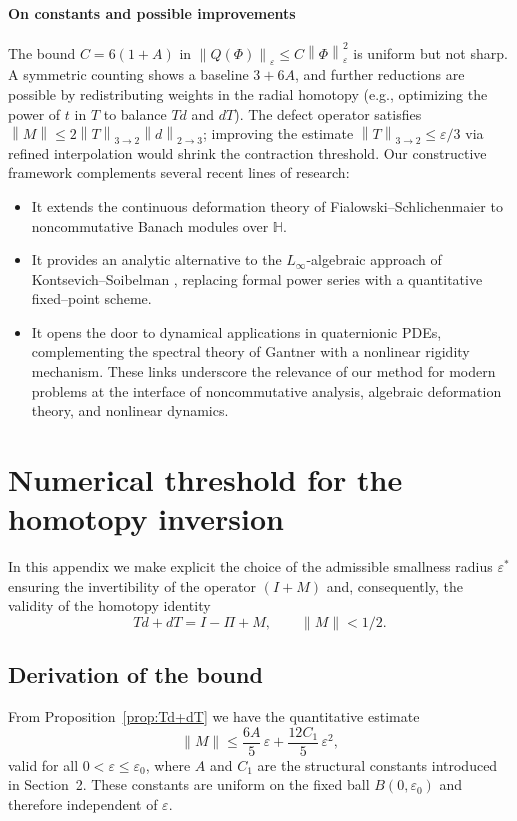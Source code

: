 \documentclass[10pt]{amsart}
\newcommand{\norm}[1]{\left\lVert #1 \right\rVert}
\numberwithin{equation}{section}
\theoremstyle{remark}
\theoremstyle{definition}
\begin{document}
\paragraph{On constants and possible improvements}
The bound $C=6(1+A)$ in $\norm{Q(\Phi)}_\varepsilon \le C\norm{\Phi}_\varepsilon^2$
is uniform but not sharp. A symmetric counting shows a baseline $3+6A$, and
further reductions are possible by redistributing weights in the radial homotopy
(e.g., optimizing the power of $t$ in $T$ to balance $Td$ and $dT$). The defect
operator satisfies $\norm{M}\le 2\norm{T}_{3\to2}\norm{d}_{2\to3}$; improving the
estimate $\norm{T}_{3\to2}\le\varepsilon/3$ via refined interpolation would shrink
the contraction threshold.
Our constructive framework complements several recent lines of research:\begin{itemize}
\item It extends the continuous deformation theory of Fialowski--Schlichenmaier \cite{Fialowski2021} to noncommutative Banach modules over \(\mathbb{H}\).
    \item It provides an analytic alternative to the \(L_\infty\)-algebraic approach of Kontsevich--Soibelman \cite{Kontsevich2022}, replacing formal power series with a quantitative fixed--point scheme.
    \item It opens the door to dynamical applications in quaternionic PDEs, complementing the spectral theory of Gantner \cite{Gantner2024} with a nonlinear rigidity mechanism.
These links underscore the relevance of our method for modern problems at the interface of noncommutative analysis, algebraic deformation theory, and nonlinear dynamics.\end{itemize}
\appendix

\appendix
\section{Numerical threshold for the homotopy inversion}

In this appendix we make explicit the choice of the admissible smallness
radius $\varepsilon^\ast$ ensuring the invertibility of the operator
$(I+M)$ and, consequently, the validity of the homotopy identity
\[
T d + d T = I - \Pi + M, \qquad \|M\|<1/2.
\]

\subsection{Derivation of the bound}

From Proposition~\ref{prop:Td+dT} we have the quantitative estimate
\begin{equation}\label{eq:Mbound}
\|M\| \le \frac{6A}{5}\,\varepsilon + \frac{12C_1}{5}\,\varepsilon^2,
\end{equation}
valid for all $0<\varepsilon\le\varepsilon_0$, where
$A$ and $C_1$ are the structural constants introduced in Section~2.
These constants are uniform on the fixed ball $B(0,\varepsilon_0)$
and therefore independent of $\varepsilon$.
\end{document}
